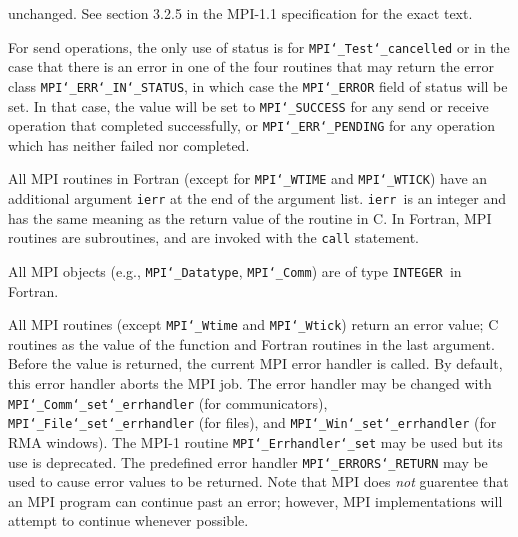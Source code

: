 unchanged.  See section 3.2.5 in the MPI-1.1 specification for the
exact text.
\par
For send operations, the only use of status is for {\tt MPI{\tt \char`\_}Test{\tt \char`\_}cancelled} or
in the case that there is an error in one of the four routines that
may return the error class {\tt MPI{\tt \char`\_}ERR{\tt \char`\_}IN{\tt \char`\_}STATUS}, in which case the
{\tt MPI{\tt \char`\_}ERROR} field of status will be set.  In that case, the value
will be set to {\tt MPI{\tt \char`\_}SUCCESS} for any send or receive operation that completed
successfully, or {\tt MPI{\tt \char`\_}ERR{\tt \char`\_}PENDING} for any operation which has neither
failed nor completed.
\par
{}
All MPI routines in Fortran (except for {\tt MPI{\tt \char`\_}WTIME} and {\tt MPI{\tt \char`\_}WTICK}) have
an additional argument {\tt ierr} at the end of the argument list.  {\tt ierr
}is an integer and has the same meaning as the return value of the routine
in C.  In Fortran, MPI routines are subroutines, and are invoked with the
{\tt call} statement.
\par
All MPI objects (e.g., {\tt MPI{\tt \char`\_}Datatype}, {\tt MPI{\tt \char`\_}Comm}) are of type {\tt INTEGER
}in Fortran.
\par
{}
\par
All MPI routines (except {\tt MPI{\tt \char`\_}Wtime} and {\tt MPI{\tt \char`\_}Wtick}) return an error value;
C routines as the value of the function and Fortran routines in the last
argument.  Before the value is returned, the current MPI error handler is
called.  By default, this error handler aborts the MPI job.  The error handler
may be changed with {\tt MPI{\tt \char`\_}Comm{\tt \char`\_}set{\tt \char`\_}errhandler} (for communicators),
{\tt MPI{\tt \char`\_}File{\tt \char`\_}set{\tt \char`\_}errhandler} (for files), and {\tt MPI{\tt \char`\_}Win{\tt \char`\_}set{\tt \char`\_}errhandler} (for
RMA windows).  The MPI-1 routine {\tt MPI{\tt \char`\_}Errhandler{\tt \char`\_}set} may be used but
its use is deprecated.  The predefined error handler
{\tt MPI{\tt \char`\_}ERRORS{\tt \char`\_}RETURN} may be used to cause error values to be returned.
Note that MPI does {\em not} guarentee that an MPI program can continue past
an error; however, MPI implementations will attempt to continue whenever
possible.
\par
{}
